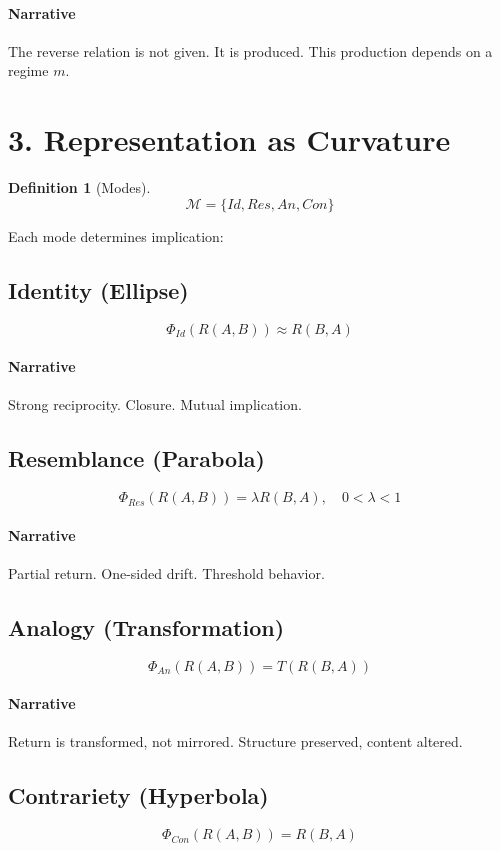 \documentclass[11pt]{article}
\newtheorem{definition}{Definition}
\begin{document}
\paragraph{Narrative}
The reverse relation is not given. It is produced.
This production depends on a regime $m$.

\section{3. Representation as Curvature}

\begin{definition}[Modes]
\[
\mathcal{M} = \{Id, Res, An, Con\}
\]
\end{definition}

Each mode determines implication:

\subsection*{Identity (Ellipse)}
\[
\Phi_{Id}(R(A,B)) \approx R(B,A)
\]

\paragraph{Narrative}
Strong reciprocity. Closure. Mutual implication.

\subsection*{Resemblance (Parabola)}
\[
\Phi_{Res}(R(A,B)) = \lambda R(B,A), \quad 0<\lambda<1
\]

\paragraph{Narrative}
Partial return. One-sided drift. Threshold behavior.

\subsection*{Analogy (Transformation)}
\[
\Phi_{An}(R(A,B)) = T(R(B,A))
\]

\paragraph{Narrative}
Return is transformed, not mirrored.
Structure preserved, content altered.

\subsection*{Contrariety (Hyperbola)}
\[
\Phi_{Con}(R(A,B)) = R(B,A)
\]
\end{document}
